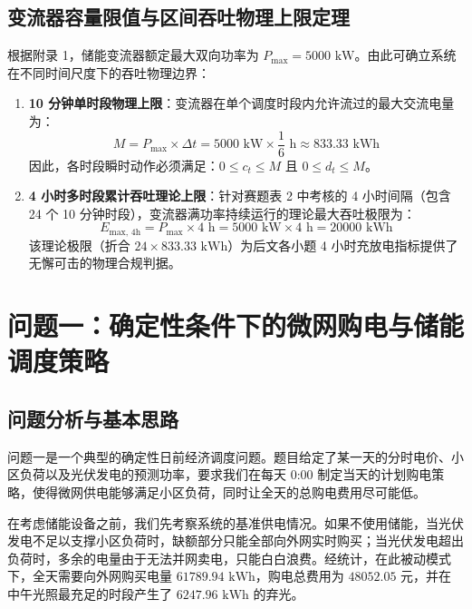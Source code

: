 \documentclass[withoutpreface]{cumcmthesis}
\begin{document}
\subsection{变流器容量限值与区间吞吐物理上限定理}
根据附录 1，储能变流器额定最大双向功率为 $P_{\max} = 5000\text{ kW}$。由此可确立系统在不同时间尺度下的吞吐物理边界：
\begin{enumerate}
    \item \textbf{10 分钟单时段物理上限}：变流器在单个调度时段内允许流过的最大交流电量为：
    \begin{equation}
        M = P_{\max} \times \Delta t = 5000\text{ kW} \times \frac{1}{6}\text{ h} \approx 833.33\text{ kWh}
    \end{equation}
    因此，各时段瞬时动作必须满足：$0 \le c_t \le M$ 且 $0 \le d_t \le M$。
    
    \item \textbf{4 小时多时段累计吞吐理论上限}：针对赛题表 2 中考核的 4 小时间隔（包含 24 个 10 分钟时段），变流器满功率持续运行的理论最大吞吐极限为：
    \begin{equation}
        E_{\text{max, 4h}} = P_{\max} \times 4\text{ h} = 5000\text{ kW} \times 4\text{ h} = 20000\text{ kWh}
    \end{equation}
    该理论极限（折合 $24 \times 833.33\text{ kWh}$）为后文各小题 4 小时充放电指标提供了无懈可击的物理合规判据。
\end{enumerate}

\section{问题一：确定性条件下的微网购电与储能调度策略}

\subsection{问题分析与基本思路}
问题一是一个典型的确定性日前经济调度问题。题目给定了某一天的分时电价、小区负荷以及光伏发电的预测功率，要求我们在每天 0:00 制定当天的计划购电策略，使得微网供电能够满足小区负荷，同时让全天的总购电费用尽可能低。

在考虑储能设备之前，我们先考察系统的基准供电情况。如果不使用储能，当光伏发电不足以支撑小区负荷时，缺额部分只能全部向外网实时购买；当光伏发电超出负荷时，多余的电量由于无法并网卖电，只能白白浪费。经统计，在此被动模式下，全天需要向外网购买电量 $61789.94\text{ kWh}$，购电总费用为 $48052.05\text{ 元}$，并在中午光照最充足的时段产生了 $6247.96\text{ kWh}$ 的弃光。
\end{document}
